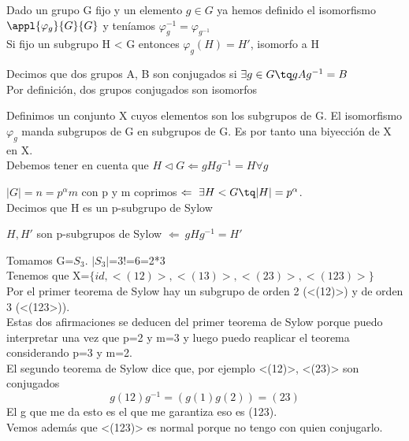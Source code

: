 \documentclass[nochap]{apuntes}
\begin{document}
Dado un grupo G fijo y un elemento $g\in G$  ya hemos definido el isomorfismo $\appl{\varphi_g}{G}{G}$  y teníamos $\varphi_{g}^{-1}=\varphi_{g^{-1}}$\\
Si fijo un subgrupo H < G entonces $\varphi_g(H)=H'$, isomorfo a H\\
\begin{defn}[Conjugado]
 Decimos que dos grupos A, B son conjugados si $\exists g \in G \tq gAg^{-1}=B$\\
 Por definición, dos grupos conjugados son isomorfos
\end{defn}

Definimos un conjunto X cuyos elementos son los subgrupos de G. El isomorfismo $\varphi_{g}$  manda subgrupos de G en subgrupos de G. 
Es por tanto una biyección de X en X.\\
Debemos tener en cuenta que $H \vartriangleleft G \Leftarrow gHg^{-1}=H \forall g$

\begin{theorem}
 $|G|=n=p^{\alpha}m$  con p y m coprimos $\Leftarrow \ \exists H < G \tq |H|=p^{\alpha}$. \\
 Decimos que H es un p-subgrupo de Sylow
\end{theorem}

\begin{theorem}
 $H, H'$  son p-subgrupos de Sylow $\Leftarrow \ gHg^{-1}=H'$
\end{theorem}

\begin{example}
 Tomamos G=$S_3$. $|S_3|$=3!=6=2*3\\
 Tenemos que X=$\{id, <(12)>, <(13)>,<(23)>,<(123)>\}$\\
 Por el primer teorema de Sylow hay un subgrupo de orden 2 (<(12)>) y de orden 3 (<(123>)).\\
 Estas dos afirmaciones se deducen del primer teorema de Sylow porque puedo interpretar una vez que p=2 y m=3 y luego puedo reaplicar
 el teorema considerando p=3 y m=2.\\
 El segundo teorema de Sylow dice que, por ejemplo <(12)>, <(23)> son conjugados\\
 \[g(12)g^{-1}=(g(1)g(2))=(23)\]
 El g que me da esto es el que me garantiza eso es (123).\\
 Vemos además que <(123)> es normal porque no tengo con quien conjugarlo.
\end{example}
\end{document}

